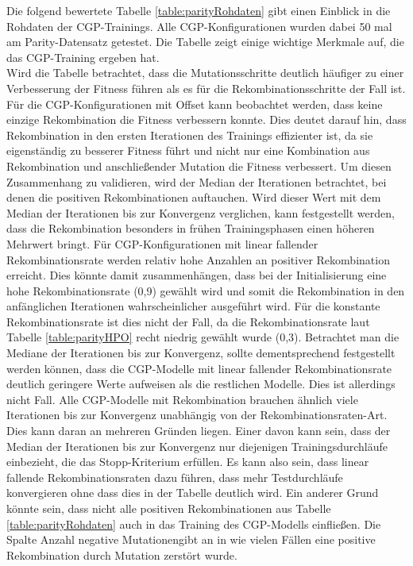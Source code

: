 Die folgend bewertete Tabelle \ref{table:parityRohdaten} gibt einen Einblick in die Rohdaten der CGP-Trainings.
Alle CGP-Konfigurationen wurden dabei 50 mal am Parity-Datensatz getestet.
Die Tabelle zeigt einige wichtige Merkmale auf, die das CGP-Training ergeben hat.\\
Wird die Tabelle betrachtet, dass die Mutationsschritte deutlich häufiger zu einer Verbesserung der Fitness führen als es für die Rekombinationsschritte der Fall ist.
Für die CGP-Konfigurationen mit Offset kann beobachtet werden, dass keine einzige Rekombination die Fitness verbessern konnte. 
Dies deutet darauf hin, dass Rekombination in den ersten Iterationen des Trainings effizienter ist, da sie eigenständig zu besserer Fitness führt und nicht nur eine Kombination aus Rekombination und anschließender Mutation die Fitness verbessert.
Um diesen Zusammenhang zu validieren, wird der Median der Iterationen betrachtet, bei denen die positiven Rekombinationen auftauchen.
Wird dieser Wert mit dem Median der Iterationen bis zur Konvergenz verglichen, kann festgestellt werden, dass die Rekombination besonders in frühen Trainingsphasen einen höheren Mehrwert bringt.
Für CGP-Konfigurationen mit linear fallender Rekombinationsrate werden relativ hohe Anzahlen an positiver Rekombination erreicht.
Dies könnte damit zusammenhängen, dass bei der Initialisierung eine hohe Rekombinationsrate (0,9) gewählt wird und somit die Rekombination in den anfänglichen Iterationen wahrscheinlicher ausgeführt wird.
Für die konstante Rekombinationsrate ist dies nicht der Fall, da die Rekombinationsrate laut Tabelle \ref{table:parityHPO} recht niedrig gewählt wurde (0,3).
Betrachtet man die Mediane der Iterationen bis zur Konvergenz, sollte dementsprechend festgestellt werden können, dass die CGP-Modelle mit linear fallender Rekombinationsrate deutlich geringere Werte aufweisen als die restlichen Modelle.
Dies ist allerdings nicht Fall.
Alle CGP-Modelle mit Rekombination brauchen ähnlich viele Iterationen bis zur Konvergenz unabhängig von der Rekombinationsraten-Art.
Dies kann daran an mehreren Gründen liegen.
Einer davon kann sein, dass der Median der Iterationen bis zur Konvergenz nur diejenigen Trainingsdurchläufe einbezieht, die das Stopp-Kriterium erfüllen. 
Es kann also sein, dass linear fallende Rekombinationsraten dazu führen, dass mehr Testdurchläufe konvergieren ohne dass dies in der Tabelle deutlich wird.
Ein anderer Grund könnte sein, dass nicht alle positiven Rekombinationen aus Tabelle \ref{table:parityRohdaten} auch in das Training des CGP-Modells einfließen. 
Die Spalte \glqq Anzahl negative Mutationen\grqq\space gibt an in wie vielen Fällen eine positive Rekombination durch Mutation zerstört wurde.
